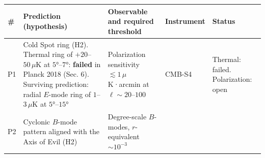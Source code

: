\documentclass[
]{article}
\begin{document}
\begin{longtable}[]{@{}lllll@{}}
\toprule
\begin{minipage}[b]{0.11\columnwidth}\raggedright
\#\strut
\end{minipage} & \begin{minipage}[b]{0.19\columnwidth}\raggedright
Prediction (hypothesis)\strut
\end{minipage} & \begin{minipage}[b]{0.19\columnwidth}\raggedright
Observable and required threshold\strut
\end{minipage} & \begin{minipage}[b]{0.19\columnwidth}\raggedright
Instrument\strut
\end{minipage} & \begin{minipage}[b]{0.19\columnwidth}\raggedright
Status\strut
\end{minipage}\tabularnewline
\midrule
\endhead
\begin{minipage}[t]{0.11\columnwidth}\raggedright
P1\strut
\end{minipage} & \begin{minipage}[t]{0.19\columnwidth}\raggedright
Cold Spot ring (H2). Thermal ring of \(+20\)--\(50\,\mu\)K at
\(5°\)--\(7°\): \textbf{failed} in Planck 2018 (Sec. 6). Surviving
prediction: radial \(E\)-mode ring of \(1\)--\(3\,\mu\)K at
\(5°\)--\(15°\)\strut
\end{minipage} & \begin{minipage}[t]{0.19\columnwidth}\raggedright
Polarization sensitivity \(\lesssim 1\,\mu\)K·arcmin at
\(\ell \sim 20\)--\(100\)\strut
\end{minipage} & \begin{minipage}[t]{0.19\columnwidth}\raggedright
CMB-S4\strut
\end{minipage} & \begin{minipage}[t]{0.19\columnwidth}\raggedright
Thermal: failed. Polarization: open\strut
\end{minipage}\tabularnewline
\begin{minipage}[t]{0.11\columnwidth}\raggedright
P2\strut
\end{minipage} & \begin{minipage}[t]{0.19\columnwidth}\raggedright
Cyclonic \(B\)-mode pattern aligned with the Axis of Evil (H2)\strut
\end{minipage} & \begin{minipage}[t]{0.19\columnwidth}\raggedright
Degree-scale \(B\)-modes, \(r\)-equivalent \(\sim\!10^{-3}\)\strut
\end{minipage} & \begin{minipage}[t]{0.19\columnwidth}\raggedright

\end{minipage}
\end{longtable}
\end{document}

